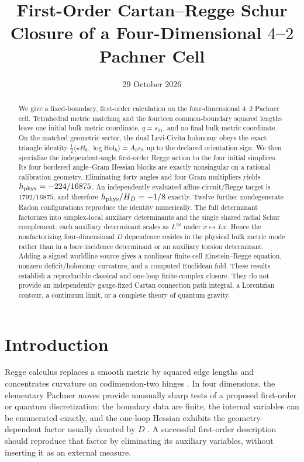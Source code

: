 \documentclass[11pt]{article}
\title{First-Order Cartan--Regge Schur Closure of a Four-Dimensional $4$--$2$ Pachner Cell}
\author{}
\date{29 October 2026}
\theoremstyle{definition}
\theoremstyle{remark}
\begin{document}
\maketitle

\begin{abstract}
We give a fixed-boundary, first-order calculation on the four-dimensional $4$--$2$ Pachner cell.  Tetrahedral metric matching and the fourteen common-boundary squared lengths leave one initial bulk metric coordinate, $q=s_{01}$, and no final bulk metric coordinate.  On the matched geometric sector, the dual Levi-Civita holonomy obeys the exact triangle identity
$\frac12\langle\star B_h,\log\mathrm{Hol}_h\rangle=A_h\epsilon_h$ up to the declared orientation sign.  We then specialize the independent-angle first-order Regge action to the four initial simplices.  Its four bordered angle--Gram Hessian blocks are exactly nonsingular on a rational calibration geometry.  Eliminating forty angles and four Gram multipliers yields
$h_{\rm phys}=-224/16875$.  An independently evaluated affine-circuit/Regge target is $1792/16875$, and therefore $h_{\rm phys}/H_D=-1/8$ exactly.  Twelve further nondegenerate Radon configurations reproduce the identity numerically.  The full determinant factorizes into simplex-local auxiliary determinants and the single shared radial Schur complement; each auxiliary determinant scales as $L^{18}$ under $x\mapsto Lx$.  Hence the nonfactorizing four-dimensional $D$ dependence resides in the physical bulk metric mode rather than in a bare incidence determinant or an auxiliary torsion determinant.  Adding a signed worldline source gives a nonlinear finite-cell Einstein--Regge equation, nonzero deficit/holonomy curvature, and a computed Euclidean fold.  These results establish a reproducible classical and one-loop finite-complex closure.  They do not provide an independently gauge-fixed Cartan connection path integral, a Lorentzian contour, a continuum limit, or a complete theory of quantum gravity.
\end{abstract}

\section{Introduction}

Regge calculus replaces a smooth metric by squared edge lengths and concentrates curvature on codimension-two hinges \cite{Regge1961}.  In four dimensions, the elementary Pachner moves provide unusually sharp tests of a proposed first-order or quantum discretization: the boundary data are finite, the internal variables can be enumerated exactly, and the one-loop Hessian exhibits the geometry-dependent factor usually denoted by $D$ \cite{DittrichSteinhaus2012,BorissovaDittrich2023}.  A successful first-order description should reproduce that factor by eliminating its auxiliary variables, without inserting it as an external measure.
\end{document}
